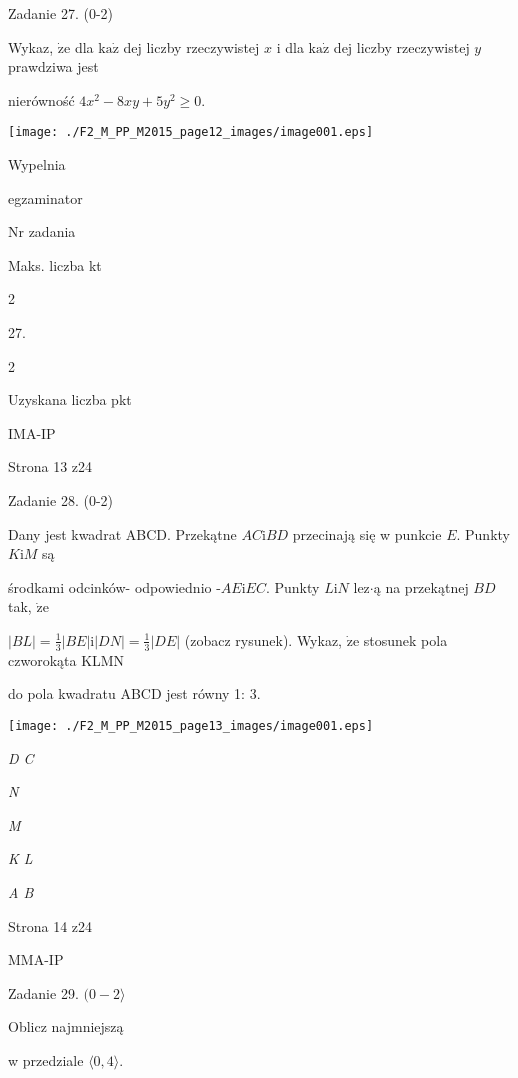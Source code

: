 \documentclass[a4paper,12pt]{article}
\begin{document}
Zadanie 27. (0-2)

Wykaz, $\dot{\mathrm{z}}\mathrm{e}$ dla $\mathrm{k}\mathrm{a}\dot{\mathrm{z}}$ dej liczby rzeczywistej $x$ i dla $\mathrm{k}\mathrm{a}\dot{\mathrm{z}}$ dej liczby rzeczywistej $y$ prawdziwa jest

nierówność $4x^{2}-8xy+5y^{2}\geq 0.$
\begin{center}
\texttt{[image: ./F2\_M\_PP\_M2015\_page12\_images/image001.eps]}
\end{center}
Wypelnia

egzaminator

Nr zadania

Maks. liczba kt

2

27.

2

Uzyskana liczba pkt

IMA-IP

Strona 13 z24





Zadanie 28. (0-2)

Dany jest kwadrat ABCD. Przekątne $AC\mathrm{i}BD$ przecinają się w punkcie $E$. Punkty $K\mathrm{i}M$ są

środkami odcinków- odpowiednio -$AE\mathrm{i}EC$. Punkty $L\mathrm{i}N$ lez$\cdot$ą na przekątnej $BD$ tak, $\dot{\mathrm{z}}\mathrm{e}$

$|BL|=\displaystyle \frac{1}{3}|BE| \mathrm{i} |DN|=\displaystyle \frac{1}{3}|DE|$ (zobacz rysunek). Wykaz, $\dot{\mathrm{z}}\mathrm{e}$ stosunek pola czworokąta KLMN

do pola kwadratu ABCD jest równy 1: 3.
\begin{center}
\texttt{[image: ./F2\_M\_PP\_M2015\_page13\_images/image001.eps]}
\end{center}
{\it D  C}

{\it N}

{\it M}

{\it K  L}

{\it A  B}

Strona 14 z24

MMA-IP





Zadanie 29. $(0-2\rangle$

Oblicz najmniejszą

w przedziale $\langle 0, 4\rangle.$
\end{document}
